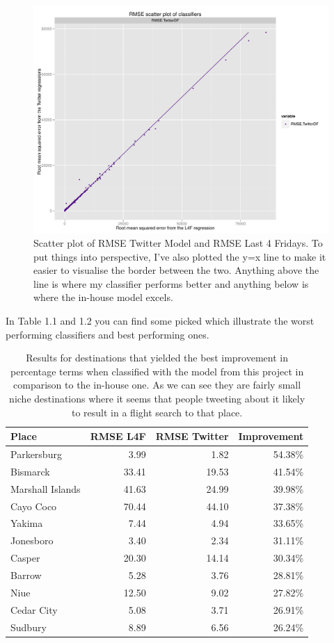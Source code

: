 \documentclass[minf,frontabs,twoside,singlespacing,parskip]{infthesis}
\begin{document}
\begin{figure}[h!]
\begin{center}
\includegraphics[scale=0.4]{RMSE}
\end{center}
\caption{Scatter plot of RMSE Twitter Model and RMSE Last 4 Fridays. To put things into perspective, I've also plotted the y=x line to make it easier to visualise the border between the two. Anything above the line is where my classifier performs better and anything below is where the in-house model excels.  }
\end{figure}

In Table 1.1 and 1.2 you can find some picked which illustrate the worst performing classifiers and best performing ones.

\begin{table}[h!]
\begin{center}
\begin{tabular}{ l | r | r | r}
Place & RMSE L4F & RMSE Twitter & Improvement \\
\hline
Parkersburg & 3.99 & 1.82 & 54.38\% \\
Bismarck & 33.41 & 19.53 & 41.54\% \\
Marshall Islands & 41.63 & 24.99 & 39.98\% \\
Cayo Coco & 70.44 & 44.10 & 37.38\% \\
Yakima & 7.44 & 4.94 & 33.65\% \\
Jonesboro & 3.40 & 2.34 & 31.11\% \\
Casper & 20.30 & 14.14 & 30.34\% \\
Barrow & 5.28 & 3.76 & 28.81\% \\
Niue & 12.50 & 9.02 & 27.82\% \\
Cedar City & 5.08 & 3.71 & 26.91\% \\
Sudbury & 8.89 & 6.56 & 26.24\% \\
\end{tabular}
\end{center}
\caption{Results for destinations that yielded the best improvement in percentage terms when classified with the model from this project in comparison to the in-house one. As we can see they are fairly small niche destinations where it seems that people tweeting about it likely to result in a flight search to that place.}
\end{table}
\end{document}
